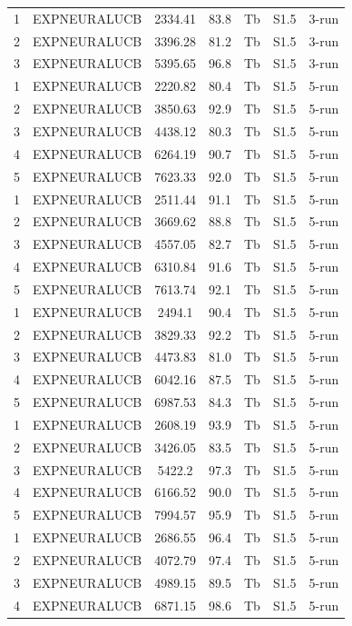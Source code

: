 \documentclass[11pt]{article}
\begin{document}
\begin{center}
\begin{longtable}{|c|c|c|c|c|c|c|}
1 & EXPNEURALUCB & 2334.41 & 83.8 & Tb & S1.5 & 3-run \\
2 & EXPNEURALUCB & 3396.28 & 81.2 & Tb & S1.5 & 3-run \\
3 & EXPNEURALUCB & 5395.65 & 96.8 & Tb & S1.5 & 3-run \\
1 & EXPNEURALUCB & 2220.82 & 80.4 & Tb & S1.5 & 5-run \\
2 & EXPNEURALUCB & 3850.63 & 92.9 & Tb & S1.5 & 5-run \\
3 & EXPNEURALUCB & 4438.12 & 80.3 & Tb & S1.5 & 5-run \\
4 & EXPNEURALUCB & 6264.19 & 90.7 & Tb & S1.5 & 5-run \\
5 & EXPNEURALUCB & 7623.33 & 92.0 & Tb & S1.5 & 5-run \\
1 & EXPNEURALUCB & 2511.44 & 91.1 & Tb & S1.5 & 5-run \\
2 & EXPNEURALUCB & 3669.62 & 88.8 & Tb & S1.5 & 5-run \\
3 & EXPNEURALUCB & 4557.05 & 82.7 & Tb & S1.5 & 5-run \\
4 & EXPNEURALUCB & 6310.84 & 91.6 & Tb & S1.5 & 5-run \\
5 & EXPNEURALUCB & 7613.74 & 92.1 & Tb & S1.5 & 5-run \\
1 & EXPNEURALUCB & 2494.1 & 90.4 & Tb & S1.5 & 5-run \\
2 & EXPNEURALUCB & 3829.33 & 92.2 & Tb & S1.5 & 5-run \\
3 & EXPNEURALUCB & 4473.83 & 81.0 & Tb & S1.5 & 5-run \\
4 & EXPNEURALUCB & 6042.16 & 87.5 & Tb & S1.5 & 5-run \\
5 & EXPNEURALUCB & 6987.53 & 84.3 & Tb & S1.5 & 5-run \\
1 & EXPNEURALUCB & 2608.19 & 93.9 & Tb & S1.5 & 5-run \\
2 & EXPNEURALUCB & 3426.05 & 83.5 & Tb & S1.5 & 5-run \\
3 & EXPNEURALUCB & 5422.2 & 97.3 & Tb & S1.5 & 5-run \\
4 & EXPNEURALUCB & 6166.52 & 90.0 & Tb & S1.5 & 5-run \\
5 & EXPNEURALUCB & 7994.57 & 95.9 & Tb & S1.5 & 5-run \\
1 & EXPNEURALUCB & 2686.55 & 96.4 & Tb & S1.5 & 5-run \\
2 & EXPNEURALUCB & 4072.79 & 97.4 & Tb & S1.5 & 5-run \\
3 & EXPNEURALUCB & 4989.15 & 89.5 & Tb & S1.5 & 5-run \\
4 & EXPNEURALUCB & 6871.15 & 98.6 & Tb & S1.5 & 5-run \\

\end{longtable}
\end{center}
\end{document}
